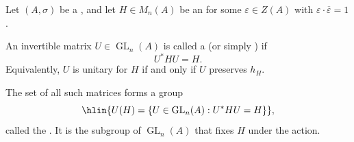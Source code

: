 \begin{definition} \label{definition:unitary_group_of_a_matrix_form_over_a_ring_with_involution}
    Let $(A,\sigma)$ be a , and let $H \in M_n(A)$ be an  for some $\varepsilon \in Z(A)$ with $\varepsilon \cdot \overline{\varepsilon} = 1$.

    An invertible matrix $U \in \operatorname{GL}_n(A)$ is called a  (or simply ) if
    $$U^* H U = H.$$
    Equivalently, $U$ is unitary for $H$ if and only if $U$ preserves $h_H$. 

    The set of all such matrices forms a group
    $$\hlin{U(H) = \{ U \in \operatorname{GL}_n(A) : U^* H U = H \}},$$
    called the . It is the subgroup of $\operatorname{GL}_n(A)$ that fixes $H$ under the  action.
\end{definition}